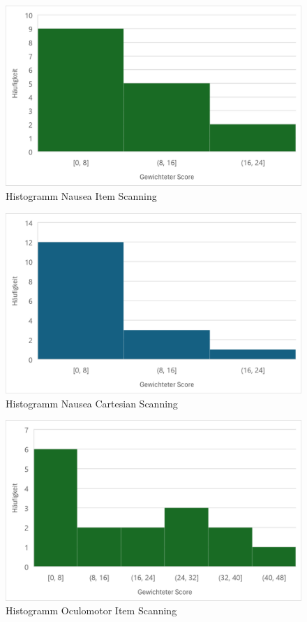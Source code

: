 \begin{figure}[tbh]
 \centering
\includegraphics{images/Results/Histogramm-Nausea-Scale-Item.png}
 \caption{Histogramm Nausea Item Scanning}
 \label{fig:histoNauseaItem}
\end{figure}

\begin{figure}[tbh]
 \centering
\includegraphics{images/Results/Histogramm-Nausea-Scale-Cartesian.png}
 \caption{Histogramm Nausea Cartesian Scanning}
 \label{fig:histoNauseaCartesian}
\end{figure}

\begin{figure}[tbh]
 \centering
\includegraphics{images/Results/Histogramm-Oculomotor-Scale-Item.png}
 \caption{Histogramm Oculomotor Item Scanning}
 \label{fig:histoOculomotorItem}
\end{figure}

